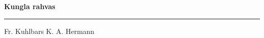 \documentclass[10pt]{book}
\begin{document}
{
  \samepage
  \raggedbottom
  \raggedright
  \sloppy


  \vspace{0.2in}

  \noindent\begin{minipage}{.1\textwidth}
    \hfill\vspace{0.1in}
  \end{minipage}%
  \noindent\begin{minipage}{.8\textwidth}
    \centering
    \bfseries
    \large Kungla rahvas
  \end{minipage}%
  \noindent\begin{minipage}{.1\textwidth}
      \hfill\vspace{0.1in}
  \end{minipage}

  \nopagebreak[4]
  \vspace{0.1in}
  \nopagebreak[4]
  \hrule height 0.05ex
  \nopagebreak[4]
  \vspace{-0.05in}

  {\footnotesize Fr. Kuhlbars \hfill K. A. Hermann }\\
  \vspace{0.01in}



}
\end{document}
